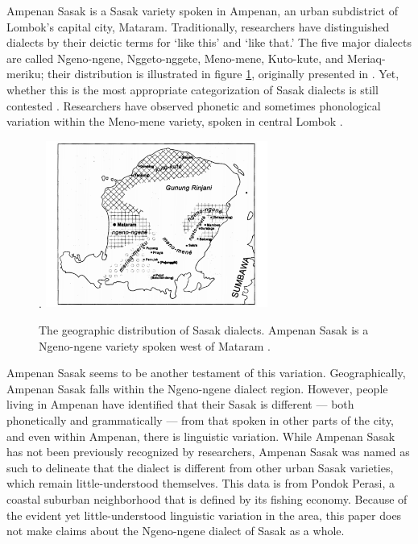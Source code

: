 \documentclass[12pt]{ouparticle}
\begin{document}
Ampenan Sasak is a Sasak variety spoken in Ampenan, an urban subdistrict of Lombok's capital city, Mataram. Traditionally, researchers have distinguished dialects by their deictic terms for ‘like this’ and ‘like that.’ The five major dialects are called Ngeno-ngene, Nggeto-nggete, Meno-mene, Kuto-kute, and Meriaq-meriku; their distribution is illustrated in figure \ref{fig:sasak_dialects}, originally presented in \citet{jacq1998}. Yet, whether this is the most appropriate categorization of Sasak dialects is still contested \citep{austin2012, jacq1998}. Researchers have observed phonetic and sometimes phonological variation within the Meno-mene variety, spoken in central Lombok \citep{archangeli2018,chahal1998,jacq1998,teeuw1958}.

\begin{figure}[h!]
    \centering
    \caption{The geographic distribution of Sasak dialects. Ampenan Sasak is a Ngeno-ngene variety spoken west of Mataram \citep{jacq1998}.}.
    \includegraphics[width=0.65\textwidth]{Figure1.pdf}
    \label{fig:sasak_dialects}
\end{figure} 

Ampenan Sasak seems to be another testament of this variation. Geographically, Ampenan Sasak falls within the Ngeno-ngene dialect region. However, people living in Ampenan have identified that their Sasak is different --- both phonetically and grammatically --- from that spoken in other parts of the city, and even within Ampenan, there is linguistic variation. While Ampenan Sasak has not been previously recognized by researchers, Ampenan Sasak was named as such to delineate that the dialect is different from other urban Sasak varieties, which remain little-understood themselves.  This data is from Pondok Perasi, a coastal suburban neighborhood that is defined by its fishing economy. Because of the evident yet little-understood linguistic variation in the area, this paper does not make claims about the Ngeno-ngene dialect of Sasak as a whole. 
\end{document}
